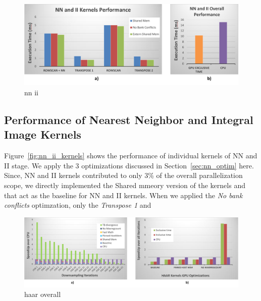 \vspace{0.1in}
\begin{figure}[h]
  \centering
  \includegraphics[width=0.9\linewidth]{figs/nn_ii_overall_crop.pdf}
  \caption{nn ii }
  \label{fig:nn_ii_overall}
\end{figure}

\subsection{Performance of Nearest Neighbor and Integral Image Kernels}
Figure~\ref{fig:nn_ii_kernels} shows the performance of individual kernels of NN and II stage.
We apply the 3 optimizations discussed in Section~\ref{sec:nn_optim} here. Since, NN and II kernels 
contributed to only 3\% of the overall parallelization scope, we directly implemented the Shared mmeory version of the kernels
and that act as the baseline for NN and II kernels. When we applied the \emph{No bank conflicts} optimzation, only the \emph{Transpose 1}
and


\begin{figure}[h]
  \centering
  \includegraphics[width=\linewidth]{figs/haar_overall_crop.pdf}
  \caption{haar overall}
  \label{fig:haar_kernels}
\end{figure}


